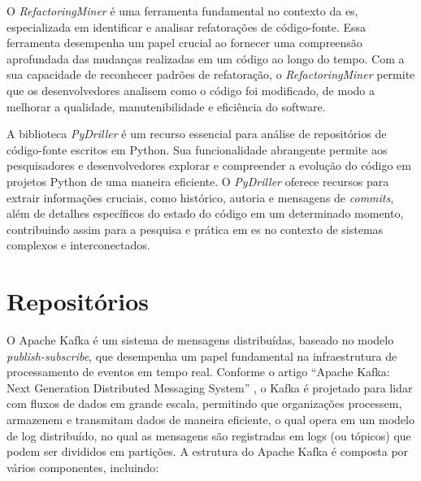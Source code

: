 O \textit{RefactoringMiner} \cite{Tsantalis:ICSE:2018:RefactoringMiner} é uma ferramenta fundamental no contexto da \gls{es}, especializada em identificar e analisar refatorações de código-fonte. Essa ferramenta desempenha um papel crucial ao fornecer uma compreensão aprofundada das mudanças realizadas em um código ao longo do tempo. Com a sua capacidade de reconhecer padrões de refatoração, o \textit{RefactoringMiner} permite que os desenvolvedores analisem como o código foi modificado, de modo a melhorar a qualidade, manutenibilidade e eficiência do software.

A biblioteca \textit{PyDriller} \cite{PyDrillerSpadini2018} é um recurso essencial para análise de repositórios de código-fonte escritos em Python. Sua funcionalidade abrangente permite aos pesquisadores e desenvolvedores explorar e compreender a evolução do código em projetos Python de uma maneira eficiente. O \textit{PyDriller} oferece recursos para extrair informações cruciais, como histórico, autoria e mensagens de \textit{commits}, além de detalhes específicos do estado do código em um determinado momento, contribuindo assim para a pesquisa e prática em \gls{es} no contexto de sistemas complexos e interconectados.

\section{Repositórios}\label{sec:repositorios}

O Apache Kafka \cite{KafkaGitHub} é um sistema de mensagens distribuídas, baseado no modelo \textit{publish-subscribe}, que desempenha um papel fundamental na infraestrutura de processamento de eventos em tempo real. Conforme o artigo ``Apache Kafka: Next Generation Distributed Messaging System'' \cite{ApacheKafkaNextGenerationDistributedMessagingSystem:2010}, o Kafka é projetado para lidar com fluxos de dados em grande escala, permitindo que organizações processem, armazenem e transmitam dados de maneira eficiente, o qual opera em um modelo de log distribuído, no qual as mensagens são registradas em logs (ou tópicos) que podem ser divididos em partições. 
A estrutura do Apache Kafka é composta por vários componentes, incluindo:

